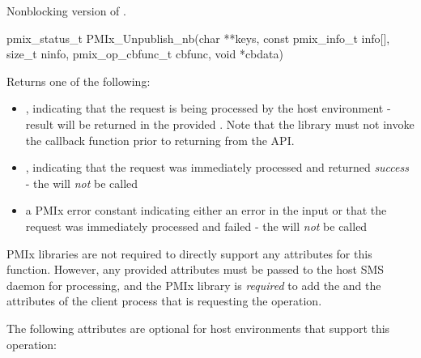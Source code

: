 \summary

Nonblocking version of .

\format

\cspecificstart
\begin{codepar}
pmix_status_t
PMIx_Unpublish_nb(char **keys,
                  const pmix_info_t info[], size_t ninfo,
                  pmix_op_cbfunc_t cbfunc, void *cbdata)
\end{codepar}
\cspecificend

\begin{arglist}
\end{arglist}

Returns one of the following:

\begin{itemize}
    \item {}, indicating that the request is being processed by the host environment - result will be returned in the provided . Note that the library must not invoke the callback function prior to returning from the \ac{API}.
    \item {}, indicating that the request was immediately processed and returned \textit{success} - the  will \textit{not} be called
    \item a PMIx error constant indicating either an error in the input or that the request was immediately processed and failed - the  will \textit{not} be called
\end{itemize}

\reqattrstart
\ac{PMIx} libraries are not required to directly support any attributes for this function. However, any provided attributes must be passed to the host \ac{SMS} daemon for processing, and the \ac{PMIx} library is \textit{required} to add the  and the  attributes of the client process that is requesting the operation.

\reqattrend

\optattrstart
The following attributes are optional for host environments that support this operation:

